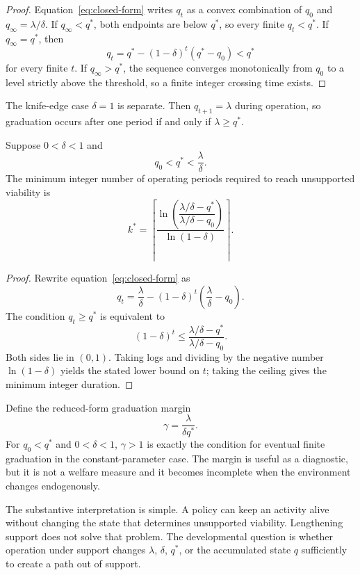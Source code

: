 \begin{proof}
Equation~\eqref{eq:closed-form} writes $q_t$ as a convex combination of $q_0$ and $q_\infty=\lambda/\delta$. If $q_\infty<q^*$, both endpoints are below $q^*$, so every finite $q_t<q^*$. If $q_\infty=q^*$, then
\[
q_t=q^*-(1-\delta)^t(q^*-q_0)<q^*
\]
for every finite $t$. If $q_\infty>q^*$, the sequence converges monotonically from $q_0$ to a level strictly above the threshold, so a finite integer crossing time exists.
\end{proof}

The knife-edge case $\delta=1$ is separate. Then $q_{t+1}=\lambda$ during operation, so graduation occurs after one period if and only if $\lambda\ge q^*$.

\begin{corollary}
\label{cor:duration}
Suppose $0<\delta<1$ and
\[
q_0<q^*<\frac{\lambda}{\delta}.
\]
The minimum integer number of operating periods required to reach unsupported viability is
\begin{equation}
k^*
=
\left\lceil
\frac{
\ln\left(
\dfrac{\lambda/\delta-q^*}{\lambda/\delta-q_0}
\right)
}{
\ln(1-\delta)
}
\right\rceil.
\label{eq:min-duration}
\end{equation}
\end{corollary}

\begin{proof}
Rewrite equation~\eqref{eq:closed-form} as
\[
q_t
=
\frac{\lambda}{\delta}
-(1-\delta)^t
\left(
\frac{\lambda}{\delta}-q_0
\right).
\]
The condition $q_t\ge q^*$ is equivalent to
\[
(1-\delta)^t
\le
\frac{\lambda/\delta-q^*}{\lambda/\delta-q_0}.
\]
Both sides lie in $(0,1)$. Taking logs and dividing by the negative number $\ln(1-\delta)$ yields the stated lower bound on $t$; taking the ceiling gives the minimum integer duration.
\end{proof}

Define the reduced-form graduation margin
\begin{equation}
\gamma
=
\frac{\lambda}{\delta q^*}.
\label{eq:gamma}
\end{equation}
For $q_0<q^*$ and $0<\delta<1$, $\gamma>1$ is exactly the condition for eventual finite graduation in the constant-parameter case. The margin is useful as a diagnostic, but it is not a welfare measure and it becomes incomplete when the environment changes endogenously.

The substantive interpretation is simple. A policy can keep an activity alive without changing the state that determines unsupported viability. Lengthening support does not solve that problem. The developmental question is whether operation under support changes $\lambda$, $\delta$, $q^*$, or the accumulated state $q$ sufficiently to create a path out of support.
